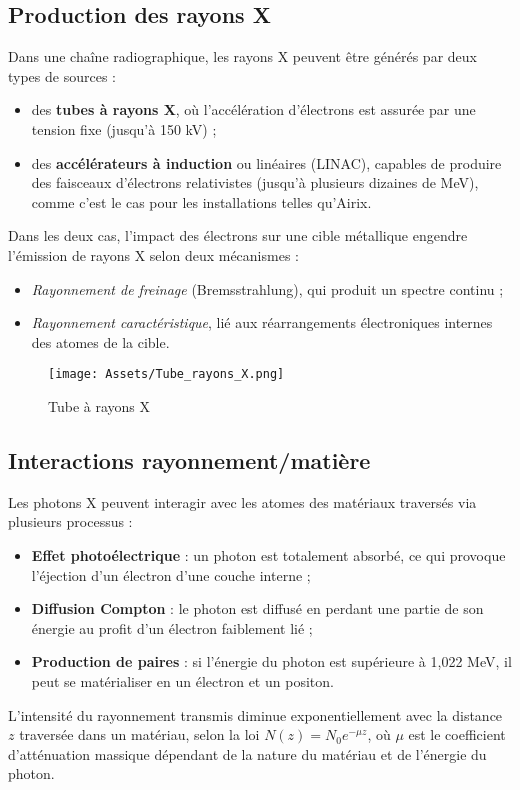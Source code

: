 \documentclass[12pt,a4paper]{report}
\begin{document}
\subsection{Production des rayons X}
Dans une chaîne radiographique, les rayons X peuvent être générés par deux types de sources :
\begin{itemize}
\item des \textbf{tubes à rayons X}, où l’accélération d’électrons est assurée par une tension fixe (jusqu’à 150 kV) ;
\item des \textbf{accélérateurs à induction} ou linéaires (LINAC), capables de produire des faisceaux d’électrons relativistes (jusqu’à plusieurs dizaines de MeV), comme c’est le cas pour les installations telles qu’Airix.
\end{itemize}
Dans les deux cas, l’impact des électrons sur une cible métallique engendre l’émission de rayons X selon deux mécanismes :
\begin{itemize}
\item \textit{Rayonnement de freinage} (Bremsstrahlung), qui produit un spectre continu ;
\item \textit{Rayonnement caractéristique}, lié aux réarrangements électroniques internes des atomes de la cible.
\end{itemize}
\begin{figure}[H]
    \centering
    \texttt{[image: Assets/Tube\_rayons\_X.png]}
    \caption{Tube à rayons X}
    \label{fig:images}
\end{figure}

\subsection{Interactions rayonnement/matière}
Les photons X peuvent interagir avec les atomes des matériaux traversés via plusieurs processus :
\begin{itemize}
\item \textbf{Effet photoélectrique} : un photon est totalement absorbé, ce qui provoque l’éjection d’un électron d’une couche interne ;
\item \textbf{Diffusion Compton} : le photon est diffusé en perdant une partie de son énergie au profit d’un électron faiblement lié ;
\item \textbf{Production de paires} : si l’énergie du photon est supérieure à 1,022 MeV, il peut se matérialiser en un électron et un positon.
\end{itemize}
L’intensité du rayonnement transmis diminue exponentiellement avec la distance $z$ traversée dans un matériau, selon la loi $N(z) = N_0 e^{-\mu z}$, où $\mu$ est le coefficient d’atténuation massique dépendant de la nature du matériau et de l’énergie du photon.
\end{document}
